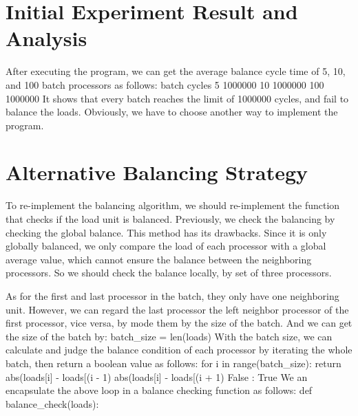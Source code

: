 \documentclass{article}%
\newenvironment{code}%
   {\snugshade\verbatim}%
   {\endverbatim\endsnugshade}
\begin{document}
\section{Initial Experiment Result and Analysis}
\begin{Large}
After executing the program, we can get the average balance cycle time of 5, 10, and 100 batch processors as follows:
\begin{code}
    batch   cycles
    5       1000000
    10      1000000
    100     1000000
\end{code}
It shows that every batch reaches the limit of 1000000 cycles, and fail to balance the loads. Obviously, we have to choose another way to implement the program.

\end{Large}
\section{Alternative Balancing Strategy}
\begin{Large}
To re-implement the balancing algorithm, we should re-implement the function that checks if the load unit is balanced. Previously, we check the balancing by checking the global balance. This method has its drawbacks. Since it is only globally balanced, we only compare the load of each processor with a global average value, which cannot ensure the balance between the neighboring processors. So we should check the balance locally, by set of three processors.

As for the first and last processor in the batch, they only have one neighboring unit. However, we can regard the last processor the left neighbor processor of the first processor, vice versa, by mode them by the size of the batch. And we can get the size of the batch by:
\begin{code}
    batch_size = len(loads)
\end{code}
With the batch size, we can calculate and judge the balance condition of each processor by iterating the whole batch, then return a boolean value as follows:
\newpage
\begin{code}
    for i in range(batch_size):
        return abs(loads[i] - loads[(i - 1) %
               abs(loads[i] - loads[(i + 1) %
               False : True 
\end{code}
We an encapsulate the above loop in a balance checking function as follows:
\begin{code}
    def balance_check(loads):
\end{code}



\end{Large}
\end{document}
